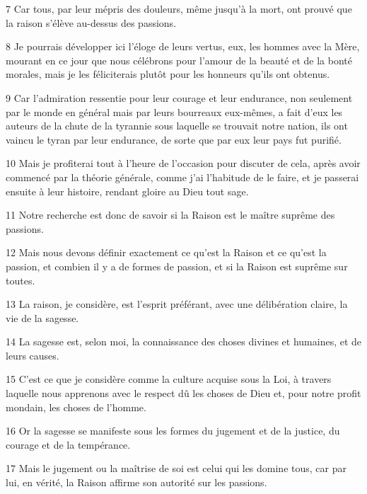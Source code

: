 \par 7 Car tous, par leur mépris des douleurs, même jusqu'à la mort, ont prouvé que la raison s'élève au-dessus des passions.

\par 8 Je pourrais développer ici l'éloge de leurs vertus, eux, les hommes avec la Mère, mourant en ce jour que nous célébrons pour l'amour de la beauté et de la bonté morales, mais je les féliciterais plutôt pour les honneurs qu'ils ont obtenus.

\par 9 Car l'admiration ressentie pour leur courage et leur endurance, non seulement par le monde en général mais par leurs bourreaux eux-mêmes, a fait d'eux les auteurs de la chute de la tyrannie sous laquelle se trouvait notre nation, ils ont vaincu le tyran par leur endurance, de sorte que par eux leur pays fut purifié.

\par 10 Mais je profiterai tout à l'heure de l'occasion pour discuter de cela, après avoir commencé par la théorie générale, comme j'ai l'habitude de le faire, et je passerai ensuite à leur histoire, rendant gloire au Dieu tout sage.

\par 11 Notre recherche est donc de savoir si la Raison est le maître suprême des passions.

\par 12 Mais nous devons définir exactement ce qu'est la Raison et ce qu'est la passion, et combien il y a de formes de passion, et si la Raison est suprême sur toutes.

\par 13 La raison, je considère, est l'esprit préférant, avec une délibération claire, la vie de la sagesse.

\par 14 La sagesse est, selon moi, la connaissance des choses divines et humaines, et de leurs causes.

\par 15 C'est ce que je considère comme la culture acquise sous la Loi, à travers laquelle nous apprenons avec le respect dû les choses de Dieu et, pour notre profit mondain, les choses de l'homme.

\par 16 Or la sagesse se manifeste sous les formes du jugement et de la justice, du courage et de la tempérance.

\par 17 Mais le jugement ou la maîtrise de soi est celui qui les domine tous, car par lui, en vérité, la Raison affirme son autorité sur les passions.

